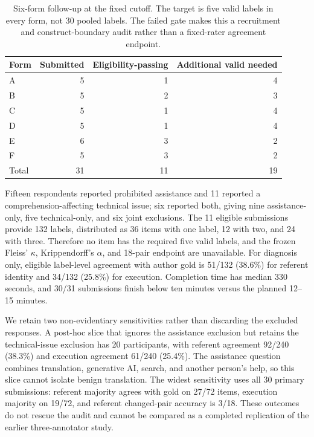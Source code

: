 \documentclass[10pt]{article}
\begin{document}
\begin{table}[H]
\centering
\small
\begin{tabular}{lrrr}
\toprule
Form & Submitted & Eligibility-passing & Additional valid needed \\
\midrule
A & 5 & 1 & 4 \\
B & 5 & 2 & 3 \\
C & 5 & 1 & 4 \\
D & 5 & 1 & 4 \\
E & 6 & 3 & 2 \\
F & 5 & 3 & 2 \\
\midrule
Total & 31 & 11 & 19 \\
\bottomrule
\end{tabular}
\caption{Six-form follow-up at the fixed cutoff. The target is five valid labels in every form,
not 30 pooled labels. The failed gate makes this a recruitment and construct-boundary audit rather
than a fixed-rater agreement endpoint.}
\label{tab:supp-wjx-incomplete}
\end{table}

Fifteen respondents reported prohibited assistance and 11 reported a comprehension-affecting
technical issue; six reported both, giving nine assistance-only, five technical-only, and six
joint exclusions. The 11 eligible submissions provide 132 labels, distributed as 36 items with
one label, 12 with two, and 24 with three. Therefore no item has the required five valid labels,
and the frozen Fleiss' $\kappa$, Krippendorff's $\alpha$, and 18-pair endpoint are unavailable.
For diagnosis only, eligible label-level agreement with author gold is 51/132 (38.6\%) for
referent identity and 34/132 (25.8\%) for execution. Completion time has median 330 seconds, and
30/31 submissions finish below ten minutes versus the planned 12--15 minutes.

We retain two non-evidentiary sensitivities rather than discarding the excluded responses. A
post-hoc slice that ignores the assistance exclusion but retains the technical-issue exclusion has
20 participants, with referent agreement 92/240 (38.3\%) and execution agreement 61/240 (25.4\%).
The assistance question combines translation, generative AI, search, and another person's help,
so this slice cannot isolate benign translation. The widest sensitivity uses all 30 primary
submissions: referent majority agrees with gold on 27/72 items, execution majority on 19/72, and
referent changed-pair accuracy is 3/18. These outcomes do not rescue the audit and cannot be
compared as a completed replication of the earlier three-annotator study.
\end{document}
